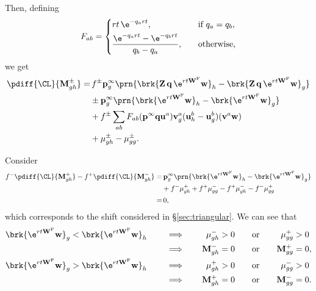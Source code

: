 \documentclass[12pt]{article}
\newcommand{\eq}{\mathbf{p}^\infty}
\newcommand{\fund}{\mathbf{Z}}
\newcommand{\w}{\mathbf{w}}
\newcommand{\uv}{\mathbf{u}}
\newcommand{\vv}{\mathbf{v}}
\newcommand{\W}{\mathbf{W}}
\newcommand{\M}{\mathbf{M}}
\newcommand{\enc}{\mathbf{q}}
\newcommand{\frg}{\W^{\mathrm{F}}}
\begin{document}
Then, defining
%
\begin{equation}\label{eq:eigdiff}
  F_{ab} = \left\{
           \begin{aligned}
             &rt\,\e^{-q_art}, &\quad&\text{if } q_a=q_b,\\
             &\frac{\e^{-q_art}-\e^{-q_brt}}{q_b-q_a}, &&\text{otherwise,}
           \end{aligned}
           \right.
\end{equation}
%
we get
%
\begin{equation}\label{findiff}
\begin{aligned}
  \pdiff{\CL}{\M^\pm_{gh}} =&\,
    f^\pm \eq_g \prn{\brk{\fund \, \enc \, \e^{rt\frg} \w}_h - \brk{\fund \, \enc \, \e^{rt\frg} \w}_g} \\
    &\pm \eq_g \prn{\brk{\e^{rt\frg} \w}_h - \brk{\e^{rt\frg} \w}_g} \\
    &+ f^\pm \sum_{ab} F_{ab} (\eq\enc\uv^a) \vv^a_g (\uv^b_h-\uv^b_g) (\vv^a\w) \\
    &+ \mu^\pm_{gh} - \mu^\pm_{gg}.
\end{aligned}
\end{equation}
%

Consider
%
\begin{equation}\label{eq:finshiftq}
\begin{aligned}
  f^- \pdiff{\CL}{\M^+_{gh}} - f^+ \pdiff{\CL}{\M^-_{gh}}
   =&\, \eq_g \prn{\brk{\e^{rt\frg} \w}_h - \brk{\e^{rt\frg} \w}_g}\\
    &+ f^- \mu^+_{gh} + f^+\mu^-_{gg} - f^+ \mu^-_{gh} - f^- \mu^+_{gg}\\
   =&\, 0,
\end{aligned}
\end{equation}
%
which corresponds to the shift considered in \S\ref{sec:triangular}. We can see that
%
\begin{equation}\label{eq:etalambdaineq}
  \begin{aligned}
    \brk{\e^{rt\frg} \w}_g &< \brk{\e^{rt\frg} \w}_h
    &\quad & \implies \quad&
    \mu^-_{gh} &> 0
    &\quad & \text{or} \quad&
    \mu^+_{gg} &> 0
    \\ &
    &\quad & \implies \quad&
    \M^-_{gh} &= 0
    &\quad & \text{or} \quad&
    \M^+_{gg} &= 0,
    \\
    \brk{\e^{rt\frg} \w}_g &> \brk{\e^{rt\frg} \w}_h
    &\quad & \implies \quad&
    \mu^+_{gh} &> 0
    &\quad & \text{or} \quad&
    \mu^-_{gg} &> 0
    \\ &
    &\quad & \implies \quad&
    \M^+_{gh} &= 0
    &\quad & \text{or} \quad&
    \M^-_{gg} &= 0.
  \end{aligned}
\end{equation}
%
\end{document}
